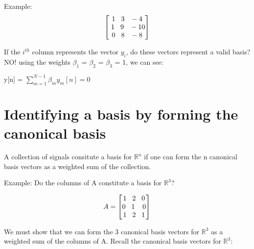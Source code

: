 \documentclass[11pt]{article}
\begin{document}
\vspace{4mm}

Example:
\[
\begin{bmatrix}
   1  \hspace{3mm}  3 \hspace{3mm}   -4  \\
\hspace{1mm}   1 \hspace{3mm}    9  \hspace{3mm}  -10\\
    0 \hspace{3mm}     8 \hspace{3mm}  -8
\end{bmatrix}
\]


If the $i^{th}$ column represents the vector $y_i$, do these vectors represent a valid basis?\newline
NO! using the weights $\beta_1$ =  $\beta_2$  = $\beta_3$ = 1, we can see:

\begin{center}
y[n] = $\sum\limits_{m = 1}^{N-1} \beta_m y_m[n] = 0$
\end{center}


\section{Identifying a basis by forming the canonical basis}
A collection of signals consitute a basis for $\mathbb{R}^{n}$ if one can form the n canonical basis vectors as a weighted sum of the collection.

Example:\newline
Do the columns of A constitute a basis for $\mathbb{R}^{3}$?

\[
A = 
\begin{bmatrix}
   1  \hspace{3mm}  2\hspace{3mm}   0 \\
    0 \hspace{3mm}    1  \hspace{4mm}  0\\
    1 \hspace{3mm}     2\hspace{3mm}  1
\end{bmatrix}
\]

\newpage
We must show that we can form the 3 canonical basis vectors for $\mathbb{R}^{3}$ as a weighted sum of the columns of A. Recall the canonical basis vectors for  $\mathbb{R}^{3}$:
\end{document}
